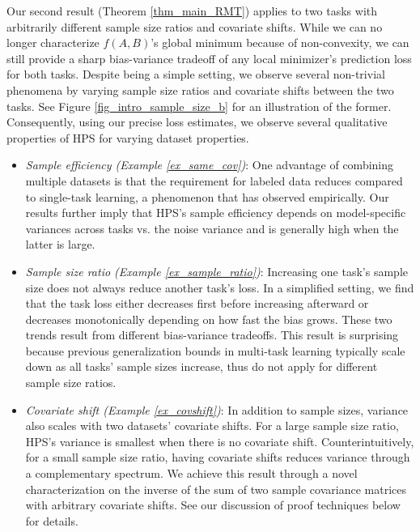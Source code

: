 \documentclass[aos,preprint]{imsart}
\begin{document}
Our second result (Theorem \ref{thm_main_RMT}) applies to two tasks with arbitrarily different sample size ratios and covariate shifts.
While we can no longer characterize $f(A, B)$'s global minimum because of non-convexity, we can still provide a sharp bias-variance tradeoff of any local minimizer's prediction loss for both tasks.
Despite being a simple setting, we observe several non-trivial phenomena by varying sample size ratios and covariate shifts between the two tasks.
See Figure \ref{fig_intro_sample_size_b} for an illustration of the former.
Consequently, using our precise loss estimates, we observe several qualitative properties of HPS for varying dataset properties.
\begin{itemize}
	\item \textit{Sample efficiency (Example \ref{ex_same_cov})}:
	One advantage of combining multiple datasets is that the requirement for labeled data reduces compared to single-task learning, a phenomenon that \cite{ZSSGM18} has observed empirically.
	Our results further imply that HPS's sample efficiency depends on model-specific variances across tasks vs. the noise variance and is generally high when the latter is large.

	\item \textit{Sample size ratio (Example \ref{ex_sample_ratio})}: Increasing one task's sample size does not always reduce another task's loss. In a simplified setting, we find that the task loss either decreases first before increasing afterward or decreases monotonically depending on how fast the bias grows. These two trends result from different bias-variance tradeoffs. This result is surprising because previous generalization bounds in multi-task learning typically scale down as all tasks' sample sizes increase, thus do not apply for different sample size ratios.

	\item \textit{Covariate shift (Example \ref{ex_covshift})}: In addition to sample sizes, variance also scales with two datasets' covariate shifts. For a large sample size ratio, HPS's  variance is smallest when there is no covariate shift. Counterintuitively, for a small sample size ratio, having covariate shifts reduces variance through a complementary spectrum. We achieve this result through a novel characterization on the inverse of the sum of two sample covariance matrices with arbitrary covariate shifts. See our discussion of proof techniques below for details.
\end{itemize}
\end{document}
